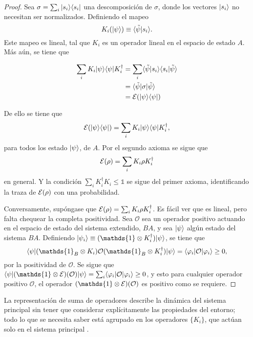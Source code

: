 \begin{proof}
Sea $\sigma=\sum_i|s_i\rangle \langle s_i|$ una descomposición de $\sigma$, donde los vectores $|s_i\rangle$ no necesitan ser normalizados. Definiendo el mapeo \[K_i(|\psi\rangle) \equiv \langle\tilde{\psi}|s_i\rangle.\] Este mapeo es lineal, tal que $K_i$ es un operador lineal en el espacio de estado $A$. Más aún, se tiene que  

\begin{equation}
    \begin{split}
       \sum_i K_i |\psi \rangle \langle \psi |K_i^\dagger&=\sum_i  \langle\tilde{\psi}|s_i\rangle \langle s_i|\tilde{\psi}\rangle\\
        &=\langle \tilde \psi |\sigma |\tilde{\psi}\rangle\\
        &=\mathcal{E}(|\psi \rangle \langle\psi|)\\
    \end{split}
\end{equation}



De ello se tiene que  \[\mathcal{E}(|\psi\rangle \langle \psi|)=\sum_i K_i |\psi \rangle \langle \psi |K_i^\dagger,\] para todos los estado $|\psi\rangle$, de $A$. Por el segundo axioma se sigue que \[\mathcal{E}(\rho)=\sum_i K_i \rho K_i^\dagger\] en general. Y la condición $\sum_i K_i^\dagger K_i\le \mathds{1}$ se sigue del primer axioma, identificando la traza de $\mathcal{E}(\rho) $ con una probabilidad.


Conversamente, supóngase que $\mathcal{E}(\rho)=\sum_i K_i \rho K_i^\dagger$. Es fácil ver que es lineal, pero falta chequear la completa positividad. Sea $\mathcal{O}$ sea un operador positivo actuando en el espacio de estado del sistema extendido, $BA$, y sea $|\psi \rangle$ algún estado del sistema $BA$. Definiendo $|\psi_i\ra \equiv (\mathds{1}\otimes K_i^\dagger)|\psi\ra$, se tiene que \[\la \psi |(\mathds{1}_B\otimes K_i)\mathcal{O}(\mathds{1}_B\otimes K_i^\dagger)|\psi\ra=\la \varphi_i |\mathcal{O}|\varphi_i\ra \ge 0,\] por la positividad de $\mathcal{O}$. Se sigue que $\la \psi| (\mathds{1}\otimes\E)(\mathcal{O})|\psi\ra=\sum_i \la \varphi_i|\mathcal{O}|\varphi_i\ra \ge 0$, y esto para cualquier operador positivo $\mathcal{O}$, el operador $(\mathds{1}\otimes \E)(\mathcal{O})$ es positivo como se requiere.
\end{proof}

La representación de suma de operadores describe la dinámica del sistema principal sin tener que considerar explícitamente las propiedades del entorno; todo lo que se necesita saber está agrupado en los operadores $\{K_i\}$, que actúan solo en el sistema principal {\cite{nielsen_chuang_2010}}.

